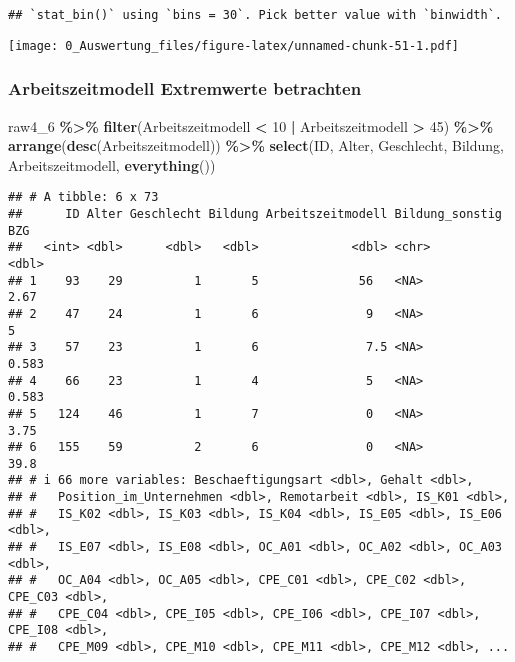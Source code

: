 \documentclass[
]{article}
\newenvironment{Shaded}{\begin{snugshade}}{\end{snugshade}}
\newcommand{\DecValTok}[1]{\textcolor[rgb]{0.00,0.00,0.81}{#1}}
\newcommand{\FunctionTok}[1]{\textcolor[rgb]{0.13,0.29,0.53}{\textbf{#1}}}
\newcommand{\NormalTok}[1]{#1}
\newcommand{\SpecialCharTok}[1]{\textcolor[rgb]{0.81,0.36,0.00}{\textbf{#1}}}
\begin{document}
\begin{verbatim}
## `stat_bin()` using `bins = 30`. Pick better value with `binwidth`.
\end{verbatim}

\texttt{[image: 0\_Auswertung\_files/figure-latex/unnamed-chunk-51-1.pdf]}

\subsubsection{Arbeitszeitmodell Extremwerte
betrachten}\label{arbeitszeitmodell-extremwerte-betrachten}

\begin{Shaded}
\begin{Highlighting}[]
\NormalTok{raw4\_6 }\SpecialCharTok{\%\textgreater{}\%} 
  \FunctionTok{filter}\NormalTok{(Arbeitszeitmodell }\SpecialCharTok{\textless{}} \DecValTok{10} \SpecialCharTok{|}\NormalTok{ Arbeitszeitmodell }\SpecialCharTok{\textgreater{}} \DecValTok{45}\NormalTok{) }\SpecialCharTok{\%\textgreater{}\%} 
  \FunctionTok{arrange}\NormalTok{(}\FunctionTok{desc}\NormalTok{(Arbeitszeitmodell)) }\SpecialCharTok{\%\textgreater{}\%} 
  \FunctionTok{select}\NormalTok{(ID, Alter, Geschlecht, Bildung, Arbeitszeitmodell, }\FunctionTok{everything}\NormalTok{())}
\end{Highlighting}
\end{Shaded}

\begin{verbatim}
## # A tibble: 6 x 73
##      ID Alter Geschlecht Bildung Arbeitszeitmodell Bildung_sonstig    BZG
##   <int> <dbl>      <dbl>   <dbl>             <dbl> <chr>            <dbl>
## 1    93    29          1       5              56   <NA>             2.67 
## 2    47    24          1       6               9   <NA>             5    
## 3    57    23          1       6               7.5 <NA>             0.583
## 4    66    23          1       4               5   <NA>             0.583
## 5   124    46          1       7               0   <NA>             3.75 
## 6   155    59          2       6               0   <NA>            39.8  
## # i 66 more variables: Beschaeftigungsart <dbl>, Gehalt <dbl>,
## #   Position_im_Unternehmen <dbl>, Remotarbeit <dbl>, IS_K01 <dbl>,
## #   IS_K02 <dbl>, IS_K03 <dbl>, IS_K04 <dbl>, IS_E05 <dbl>, IS_E06 <dbl>,
## #   IS_E07 <dbl>, IS_E08 <dbl>, OC_A01 <dbl>, OC_A02 <dbl>, OC_A03 <dbl>,
## #   OC_A04 <dbl>, OC_A05 <dbl>, CPE_C01 <dbl>, CPE_C02 <dbl>, CPE_C03 <dbl>,
## #   CPE_C04 <dbl>, CPE_I05 <dbl>, CPE_I06 <dbl>, CPE_I07 <dbl>, CPE_I08 <dbl>,
## #   CPE_M09 <dbl>, CPE_M10 <dbl>, CPE_M11 <dbl>, CPE_M12 <dbl>, ...
\end{verbatim}
\end{document}
